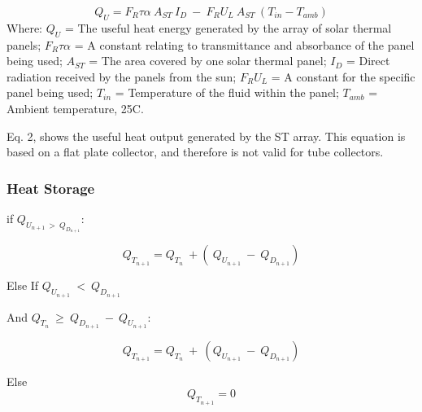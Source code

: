 \begin{equation}
Q_U = F_R \tau \alpha \ A_{ST} \ I_D \ - \ F_R U_L \ A_{ST} \ (T_{in} - T_{amb})
\end{equation}
\newline
Where:
$Q_U$ = The useful heat energy generated by the array of solar thermal panels;\newline
$F_R \tau \alpha$ = A constant relating to transmittance and absorbance of the panel being used;\newline
$A_{ST}$ = The area covered by one solar thermal panel;\newline
$I_D$ = Direct radiation received by the panels from the sun;\newline
$F_R U_L$ = A constant for the specific panel being used;\newline
$T_{in}$ = Temperature of the fluid within the panel;\newline
$T_{amb}$ = Ambient temperature, 25{\degree}C. \newline

Eq. 2, shows the useful heat output generated by the ST array. This equation is based on a flat plate collector, and therefore is not valid for tube collectors.

\subsubsection{Heat Storage}

if $Q_{U_{n+1} \ > \ Q_{D_{n+1}}}$:

\begin{equation}
Q_{T_{n+1}} = Q_{T_n} \ + (\ Q_{U_{n+1}} \ - \ Q_{D_{n+1}}) 
\end{equation}

Else If $Q_{U_{n+1}} \ < \ Q_{D_{n+1}}$ \newline

\hspace*{15pt} \vspace*{2pt} And $Q_{T_n} \ \geq \ Q_{D_{n+1}} \ - \ Q_{U_{n+1}}$:

\begin{equation}
Q_{T_{n+1}} =Q_{T_{n}} \ + \ (Q_{U_{n+1}} \ - \ Q_{D_{n+1}})
\end{equation}

\hspace*{15pt} Else 
\begin{equation}
Q_{T_{n+1}} = 0
\end{equation}

